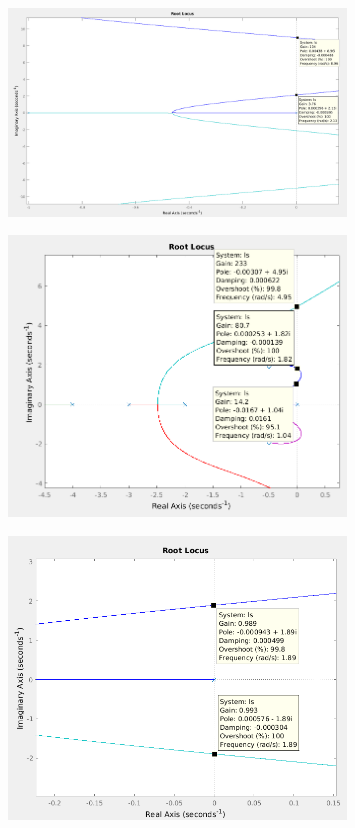
\begin{figure}[H]
\centering
\includegraphics[width=0.8\textwidth]{tarea3/matlabimg/ej2_p1.png}
\end{figure}

\begin{figure}[H]
\centering
\includegraphics[width=0.8\textwidth]{tarea3/matlabimg/ej2_p2.png}
\end{figure}

\begin{figure}[H]
\centering
\includegraphics[width=0.8\textwidth]{tarea3/matlabimg/ej2_p3.png}
\end{figure}
